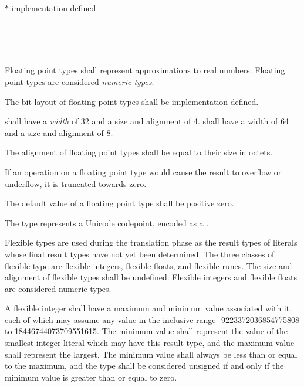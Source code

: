 $\ast$ implementation-defined


\begin{grammar}
 \\
	 \\
	 \\
\end{grammar}

\specsubsubitem
Floating point types shall represent approximations to real numbers. Floating
point types are considered \textit{numeric types}.

\specsubsubitem
The bit layout of floating point types shall be implementation-defined.

\specsubsubitem
{} shall have a \textit{width} of 32 and a size and alignment of 4.
 shall have a width of 64 and a size and alignment of 8.

\specsubsubitem
The alignment of floating point types shall be equal to their size in octets.

\specsubsubitem
If an operation on a floating point type would cause the result to overflow or
underflow, it is truncated towards zero.

\specsubsubitem
The default value of a floating point type shall be positive zero.


\specsubsubitem
The  type represents a Unicode codepoint, encoded as a
.


\specsubsubitem
Flexible types are used during the translation phase as the result types of
literals whose final result types have not yet been determined. The three
classes of flexible type are flexible integers, flexible floats, and flexible
runes. The size and alignment of flexible types shall be undefined. Flexible
integers and flexible floats are considered numeric types.

\specsubsubitem
A flexible integer shall have a maximum and minimum value associated with it,
each of which may assume any value in the inclusive range -9223372036854775808
to 18446744073709551615. The minimum value shall represent the value of the
smallest integer literal which may have this result type, and the maximum value
shall represent the largest. The minimum value shall always be less than or
equal to the maximum, and the type shall be considered unsigned if and only if
the minimum value is greater than or equal to zero.


